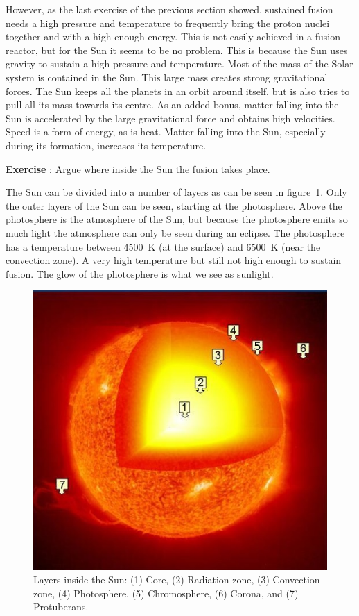 \documentclass[12pt,a4paper]{article}
\numberwithin{equation}{section}
\numberwithin{figure}{section}
\newcounter{Exercise}
\numberwithin{table}{section}
\begin{document}
However, as the last exercise of the previous section showed, sustained fusion needs a high pressure and temperature to frequently bring the proton nuclei together and with a high enough energy. This is not easily achieved in a fusion reactor, but for the Sun it seems to be no problem. This is because the Sun uses gravity to sustain a high pressure and temperature. Most of the mass of the Solar system is contained in the Sun. This large mass creates strong gravitational forces. The Sun keeps all the planets in an orbit around itself, but is also tries to pull all its mass towards its centre. As an added bonus, matter falling into the Sun is accelerated by the large gravitational force and obtains high velocities. Speed is a form of energy, as is heat. Matter falling into the Sun, especially during its formation, increases its temperature.

\begin{shaded}
\textbf{Exercise \theExercise {}} : Argue where inside the Sun the fusion takes place.\end{shaded}

The Sun can be divided into a number of layers as can be seen in figure~\ref{fig:sun_layers}. Only the outer layers of the Sun can be seen, starting at the photosphere. Above the photosphere is the atmosphere of the Sun, but because the photosphere emits so much light the atmosphere can only be seen during an eclipse. The photosphere has a temperature between 4500~K (at the surface) and 6500~K (near the convection zone). A very high temperature but still not high enough to sustain fusion. The glow of the photosphere is what we see as sunlight.

\begin{figure}\begin{center}
\includegraphics[scale=0.7]{Sun_layers.jpg}
\caption{Layers inside the Sun: (1) Core, (2) Radiation zone, (3) Convection zone, (4) Photosphere, (5) Chromosphere, (6) Corona, and (7) Protuberans.}\label{fig:sun_layers}
\end{center}\end{figure}
\end{document}
